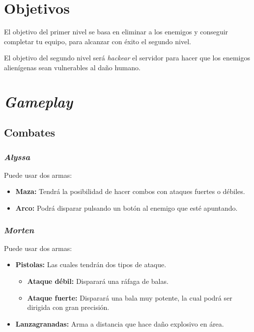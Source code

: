 \documentclass[twoside]{article}
\begin{document}
\newpage

\pagestyle{insection}
\section{Objetivos}

El objetivo del primer nivel se basa en eliminar a los enemigos y conseguir completar tu equipo, para alcanzar con éxito el segundo nivel.

El objetivo del segundo nivel será \textit{hackear} el servidor para hacer que los enemigos alienígenas sean vulnerables al daño humano. 
\newpage

\pagestyle{insection}
\section{\textit{Gameplay}}

\subsection{Combates}
\subsubsection{\textit{Alyssa}}
Puede usar dos armas:
\begin{itemize}
	\item \textbf{Maza:} Tendrá la posibilidad de hacer combos con ataques fuertes o débiles.
	\item \textbf{Arco:} Podrá disparar pulsando un botón al enemigo que esté apuntando.
\end{itemize}

\subsubsection{\textit{Morten}}
Puede usar dos armas:
\begin{itemize}
	\item \textbf{Pistolas:} Las cuales tendrán dos tipos de ataque.
	\begin{itemize}
		\item \textbf{Ataque débil:} Disparará una ráfaga de balas.
		\item \textbf{Ataque fuerte:} Disparará una bala muy potente, la cual podrá ser dirigida con gran precisión.
	\end{itemize}
	\item \textbf{Lanzagranadas:} Arma a distancia que hace daño explosivo en área.
\end{itemize}
\end{document}
